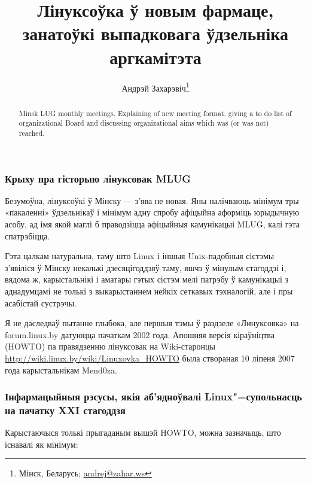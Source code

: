 \documentclass[10pt, a5paper]{article}
\begin{document}

\title{Лінуксоўка ў новым фармаце, занатоўкі выпадковага ўдзельніка аргкамітэта}%

\author{Андрэй Захарэвіч\footnote{Мінск, Беларусь; \url{andrej@zahar.ws}}}
\maketitle

\begin{abstract}
Minsk LUG monthly meetings. Explaining of new meeting format, giving a to do list of organizational Board and discussing organizational aims which was (or was not) reached.
\end{abstract}

\subsubsection*{Крыху пра гісторыю лінуксовак MLUG}

Безумоўна, лінуксоўкі ў Мінску — з'ява не новая. Яны налічваюць мінімум тры «пакаленні» ўдзельнікаў і мінімум адну спробу афіцыйна аформіць юрыдычную асобу, ад імя якой маглі б праводзіцца афіцыйныя камунікацыі MLUG, калі гэта спатрэбіцца.

Гэта цалкам натуральна, таму што Linux і іншыя Unix-падобныя сістэмы з'явіліся ў Мінску некалькі дзесяцігоддзяў таму, яшчэ ў мінулым стагоддзі і, вядома ж, карыстальнікі і аматары гэтых сістэм мелі патрэбу ў камунікацыі з аднадумцамі не толькі з выкарыстаннем нейкіх сеткавых тэхналогій, але і пры асабістай сустрэчы.

Я не даследваў пытанне глыбока, але першыя тэмы ў раздзеле «Линуксовка» на forum.linux.by датуюцца пачаткам 2002 года. Апошняя версія кіраўніцтва (HOWTO) па правядзенню лінуксовак на Wiki-старонцы \url{http://wiki.linux.by/wiki/Linuxovka\_HOWTO} была створаная 10 ліпеня 2007 года карыстальнікам Mend0za.

\subsubsection*{Інфармацыйныя рэсусы, якія аб'ядноўвалі Linux"=супольнасць на пачатку XXI стагоддзя}

Карыстаючыся толькі прыгаданым вышэй HOWTO, можна зазначыць, што існавалі як мінімум:
\end{document}
